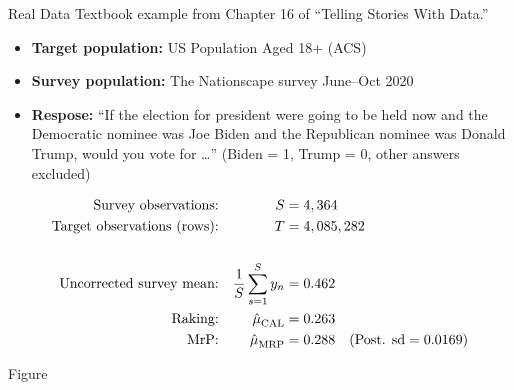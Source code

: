 
\begin{frame}{Real Data}
Textbook example from Chapter 16 of ``Telling Stories With Data.'' \citep{alexander:2023:telling}

\begin{itemize}
    \item \textbf{Target population:} US Population Aged 18+ (ACS) \citep{ipumsusa}
    \item \textbf{Survey population:} The Nationscape survey June--Oct 2020 \citep{tausanovitch:2019:democracy}
    \item \textbf{Respose:}  ``If
        the election for president were going to be held now and the Democratic
        nominee was Joe Biden and the Republican nominee was Donald Trump, would you
        vote for \ldots'' (Biden = 1, Trump = 0, other answers excluded)
\end{itemize}

$$
\begin{aligned}
    \textrm{Survey observations:} &&  S ={}& 4,364  \\
    \textrm{Target observations (rows):} &&  T ={}& 4,085,282 \\
    \\
    \textrm{Uncorrected survey mean:} && \frac{1}{S} \sum_{s=1}^S y_n ={}& 0.462 \\
    \textrm{Raking:} && \hat{\mu}^{}_{\mathrm{CAL}} ={}& 0.263 \\
    \textrm{MrP:} && \hat{\mu}^{}_{\mathrm{MRP}} ={}& 0.288
        \quad(\textrm{Post. sd} = 0.0169)\\
\end{aligned}
$$
%
\end{frame}

\begin{frame}{Figure}
\AlexanderBandFig{}
\end{frame}